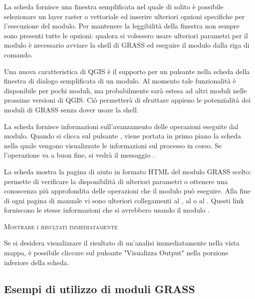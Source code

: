 
La scheda  fornisce una finestra semplificata nel quale di
solito è possibile selezionare un layer raster o vettoriale ed inserire
ulteriori opzioni specifiche per l'esecuzione del modulo. Per mantenere la
leggibilità della finestra non sempre sono presenti tutte le opzioni: qualora si
volessero usare ulteriori parametri per il modulo è necessario avviare la
shell di GRASS ed eseguire il modulo dalla riga di comando.

Una nuova caratteristica di QGIS \CURRENT è il supporto per un pulsante
 nella scheda  della 
finestra di dialogo semplificata di un modulo. Al momento tale funzionalità è 
disponibile per pochi moduli, ma probabilmente sarà estesa ad altri 
moduli nelle prossime versioni di QGIS. Ciò permetterà di sfruttare appieno le potenzialità 
dei moduli di GRASS senza dover usare la shell.


La scheda  fornisce informazioni sull'avanzamento delle
operazioni eseguite dal modulo. Quando si clicca sul pulsante ,
viene portata in primo piano la scheda  nella quale vengono
visualizzate le informazioni sul processo in corso. Se l'operazione va a buon
fine, si vedrà il messaggio .


La scheda  mostra la pagina di aiuto in formato HTML del modulo
GRASS scelto: permette di verificare la disponibilità di ulteriori
parametri o ottenere una conoscenza più approfondita delle operazioni che il
modulo può eseguire. Alla fine di ogni pagina di manuale vi sono ulteriori
collegamenti al , al  o al
. Questi link forniscono le stesse informazioni che si
avrebbero usando il modulo .

\begin{Tip}\caption{\textsc{Mostrare i risultati immediatamente}}
Se si desidera visualizzare il risultato di un'analisi immediatamente
nella vista mappa, è possibile cliccare sul pulsante "Visualizza Output" nella
porzione inferiore della scheda.
\end{Tip} 

\subsection{Esempi di utilizzo di moduli GRASS}

